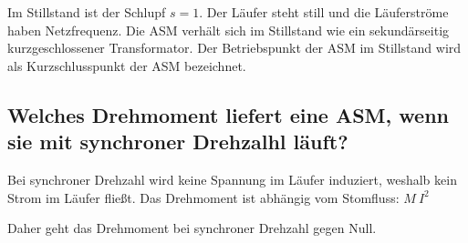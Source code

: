 \documentclass[conference]{IEEEtran}
\begin{document}
Im Stillstand ist der Schlupf $s=1$. Der Läufer steht still und die Läuferströme haben Netzfrequenz. 
Die ASM verhält sich im Stillstand wie ein sekundärseitig kurzgeschlossener Transformator. 
Der Betriebspunkt der ASM im Stillstand wird als Kurzschlusspunkt der ASM bezeichnet.

\subsection{Welches Drehmoment liefert eine ASM, wenn sie mit synchroner Drehzalhl läuft?}

Bei synchroner Drehzahl wird keine Spannung im Läufer induziert, weshalb kein Strom im Läufer fließt.
Das Drehmoment ist abhängig vom Stomfluss: $M ~ I^{2}$

Daher geht das Drehmoment bei synchroner Drehzahl gegen Null.
\end{document}
